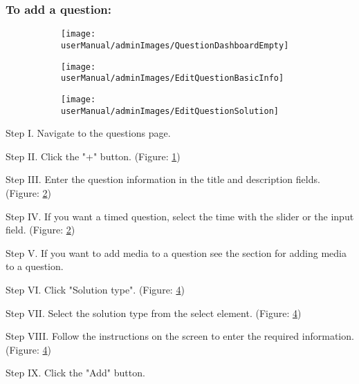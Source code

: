\subsubsection{To add a question:}

\begin{figure}[H]
	\begin{subfigure}{0.70\linewidth}
		\texttt{[image: userManual/adminImages/QuestionDashboardEmpty]}
		\caption{}
		\label{fig:QuestionDashboardEmpty}
	\end{subfigure}
	\begin{subfigure}{0.70\linewidth}
		\texttt{[image: userManual/adminImages/EditQuestionBasicInfo]}
		\caption{}
		\label{fig:EditQuestionBasicInformation}
    \end{subfigure}
	\begin{subfigure}{0.70\linewidth}
		\texttt{[image: userManual/adminImages/EditQuestionSolution]}
		\caption{}
		\label{fig:EditQuestionSolution}
	\end{subfigure}
\end{figure}

\begin{userManualItemlist}
    \item[Step I.] Navigate to the questions page.
    \item[Step II.] Click the "+" button. (Figure: \ref{fig:QuestionDashboardEmpty})
    \item[Step III.] Enter the question information in the title and description fields. (Figure: \ref{fig:EditQuestionBasicInformation})
    \item[Step IV.] If you want a timed question, select the time with the slider or the input field. (Figure: \ref{fig:EditQuestionBasicInformation})
    \item[Step V.] If you want to add media to a question see the section for adding media to a question.
    \item[Step VI.] Click "Solution type". (Figure: \ref{fig:EditQuestionSolution})
    \item[Step VII.] Select the solution type from the select element. (Figure: \ref{fig:EditQuestionSolution})
    \item[Step VIII.] Follow the instructions on the screen to enter the required information. (Figure: \ref{fig:EditQuestionSolution})
    \item[Step IX.] Click the "Add" button. 
\end{userManualItemlist}

